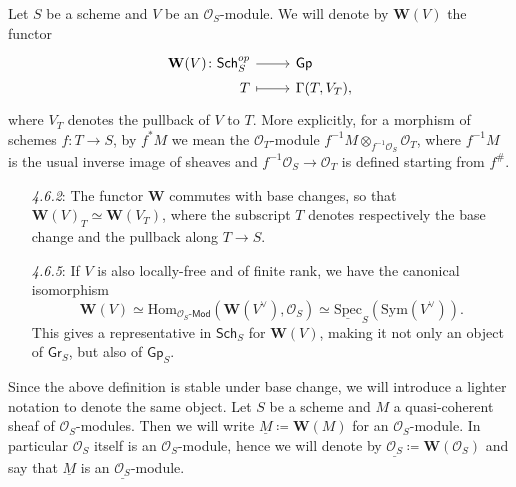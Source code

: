 \documentclass[../Main]{subfiles}
\begin{document}
\begin{defn}
	Let $S$ be a scheme and $V$ be an $\mathcal{O}_{ S }$-module.
	We will denote by $\mathbf{W}(V)$ the functor
	\begin{equation*}
	\begin{tikzcd}[row sep = 0ex
		,/tikz/column 1/.append style={anchor=base east}
		,/tikz/column 2/.append style={anchor=base west}]
		\mathbf{W}(V)\colon 
		\mathsf{Sch}_{ S }^{op} \arrow[r, "", rightarrow] &
		\mathsf{Gp} \\
		T \arrow[r, "", mapsto] & 
		\Gamma(T, V_{T})
	,\end{tikzcd}
	\end{equation*} 
	where $V_{T}$ denotes the pullback of
	$V$ to $T$.
	More explicitly, for a morphism of schemes $f\colon T \to S$, by $f^* M$ we mean 
	the $\mathcal{O}_{ T }$-module $f^{-1} M \otimes_{f^{-1}\mathcal{O}_{ S }} \mathcal{O}_{ T }$,
	where $f^{-1} M$ is the usual inverse image of sheaves and
	$f^{-1}\mathcal{O}_{ S } \to \mathcal{O}_{ T }$ is defined starting from $f^\#$.
\end{defn}


\begin{rem}\leavevmode\vspace{-1.2\baselineskip}
\begin{enumerate}
\item[{\em 4.6.2}:]
	The functor $\mathbf{W}$ commutes with base changes,
	so that $\mathbf{W}(V)_{T} \simeq \mathbf{W}(V_{T})$,
	where the subscript $T$ denotes respectively the base change 
	and the pullback along $T\to S$.

\item[{\em 4.6.5}:]
	If $V$ is also  locally-free and of finite rank, we have the canonical isomorphism
	\begin{equation*}
		\mathbf{W}(V) \simeq
		\mathrm{Hom}_{ \mathcal{O}_{ S }\text{-}\mathsf{Mod} }
		\left(\mathbf{W}(V^\vee) , \mathcal{O}_{ S } \right) \simeq
		\underline{\mathrm{Spec}}_S(\mathrm{Sym}(V^\vee))
	.\end{equation*}
	This gives a representative in $\mathsf{Sch}_{ S }$ for 
	$\mathbf{W}(V)$, making it not only an object of $\mathsf{Gr}_S$, but
	also of $\mathsf{Gp}_S$.
\end{enumerate}
\end{rem}


\begin{ntt}
	Since the above definition is stable under base change, we will introduce a 
	lighter notation to denote the same object.
	Let $S$ be a scheme and $M$ a quasi-coherent sheaf of $\mathcal{O}_{ S }$-modules.
	Then we will write $\underline{M} \coloneqq \mathbf{W}(M)$ for
	an $\mathcal{O}_{ S }$-module.
	In particular $\mathcal{O}_{ S }$ itself is an $\mathcal{O}_{ S }$-module, hence
	we will denote by $\underline{\mathcal{O}_{ S }} \coloneqq \mathbf{W}(\mathcal{O}_{ S })$
	and say that $\underline{M}$ is an $\underline{\mathcal{O}_{ S }}$-module.
\end{ntt}
\end{document}
